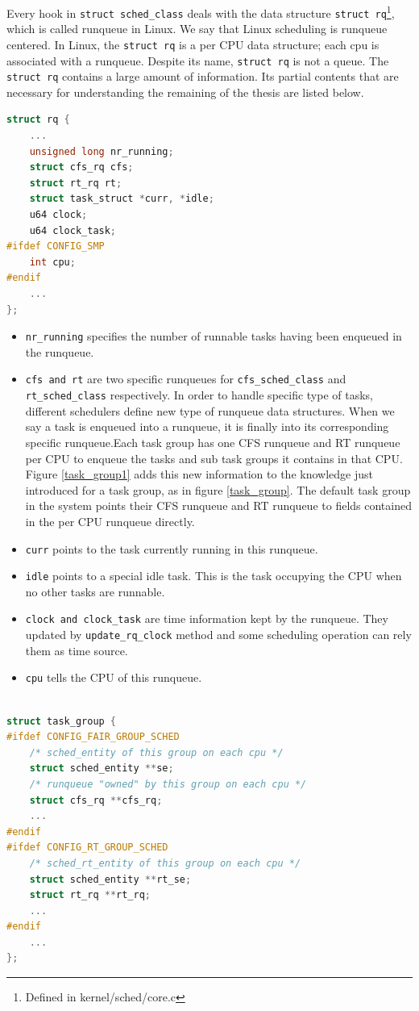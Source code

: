 Every hook in \texttt{struct sched\_class} deals with the data
structure \texttt{struct rq}\footnote{Defined in kernel/sched/core.c},
which is called runqueue in Linux.  We say that Linux scheduling is
runqueue centered. In Linux, the \texttt{struct rq} is a per CPU data
structure; each cpu is associated with a runqueue. Despite its name,
\texttt{struct rq} is not a queue. The \texttt{struct rq} contains a
large amount of information. Its partial contents that are necessary
for understanding the remaining of the thesis are listed below.
\begin{lstlisting}[language=C,
			caption={\texttt{The runqueue structure}},
			label={runqueue}]
struct rq {
	...
	unsigned long nr_running;
	struct cfs_rq cfs;
	struct rt_rq rt;
	struct task_struct *curr, *idle;
	u64 clock;
	u64 clock_task;
#ifdef CONFIG_SMP
	int cpu;
#endif
	...
};
\end{lstlisting}
\begin{itemize}
\item \texttt{nr\_running} specifies the number of runnable tasks 
	having been enqueued in the runqueue.
\item \texttt{cfs and rt} are two specific runqueues for 
	\texttt{cfs\_sched\_class} and \texttt{rt\_sched\_class} respectively. 
	In order to handle specific type of tasks, different schedulers define 
	new type of runqueue data structures. 
	When we say a task is enqueued into a runqueue, it is finally into
	its corresponding specific runqueue.Each task group has one CFS 
	runqueue and RT runqueue per CPU to enqueue the tasks and sub task
	groups it contains in that CPU. 
	Figure \ref{task_group1} adds this new information to the
	knowledge just introduced for a task group, as in 
	figure \ref{task_group}. The default task group in the system points
	their CFS runqueue and RT runqueue to fields contained in the
	per CPU runqueue directly. 
\item \texttt{curr} points to the task currently running in this runqueue.
\item \texttt{idle} points to a special idle task. This is the task occupying
		the CPU  when no other tasks are runnable.
\item \texttt{clock and clock\_task} are time information kept by the runqueue.
	They updated by \texttt{update\_rq\_clock} method and some scheduling
	operation can rely them as time source.
\item \texttt{cpu} tells the CPU of this runqueue.
\end{itemize}
\begin{lstlisting}[language=C,
caption={\texttt{Specific runqueue information within a task group}},
			label={task_group1}]		

struct task_group {
#ifdef CONFIG_FAIR_GROUP_SCHED
	/* sched_entity of this group on each cpu */
	struct sched_entity **se;
	/* runqueue "owned" by this group on each cpu */
	struct cfs_rq **cfs_rq;
	...
#endif
#ifdef CONFIG_RT_GROUP_SCHED
	/* sched_rt_entity of this group on each cpu */
	struct sched_entity **rt_se;
	struct rt_rq **rt_rq;
	...
#endif
	...
};
\end{lstlisting}


